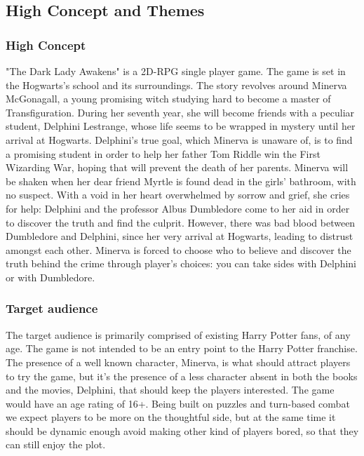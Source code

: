 \subsection{High Concept and Themes}

\subsubsection{High Concept}

"The Dark Lady Awakens" is a 2D-RPG single player game. The game is set in the Hogwarts's school and its surroundings. The story revolves around Minerva McGonagall, a young promising witch studying hard to become a master of Transfiguration. During her seventh year, she will become friends with a peculiar student, Delphini Lestrange, whose life seems to be wrapped in mystery until her arrival at Hogwarts. Delphini's true goal, which Minerva is unaware of, is to find a promising student in order to help her father Tom Riddle win the First Wizarding War, hoping that will prevent the death of her parents.
Minerva will be shaken when her dear friend Myrtle is found dead in the girls' bathroom, with no suspect. With a void in her heart overwhelmed by sorrow and grief, she cries for help: Delphini and the professor Albus Dumbledore come to her aid in order to discover the truth and find the culprit. However, there was bad blood between Dumbledore and Delphini, since her very arrival at Hogwarts, leading to distrust amongst each other.
Minerva is forced to choose who to believe and discover the truth behind the crime through player's choices: you can take sides with Delphini or with Dumbledore.

\subsubsection{Target audience}
The target audience is primarily comprised of existing Harry Potter fans, of any age. The game is not intended to be an entry point to the Harry Potter franchise. The presence of a well known character, Minerva, is what should attract players to try the game, but it's the presence of a less character absent in both the books and the movies, Delphini, that should keep the players interested. The game would have an age rating of 16+. Being built on puzzles and turn-based combat we expect players to be more on the thoughtful side, but at the same time it should be dynamic enough avoid making other kind of players bored, so that they can still enjoy the plot.

